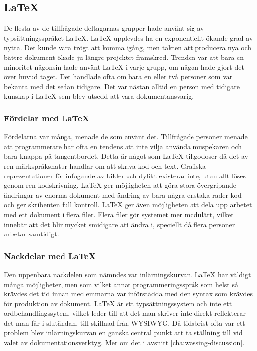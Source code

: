 \subsection{LaTeX}
\label{sec:wassing-latex}
De flesta av de tillfrågade deltagarnas grupper hade använt sig av typsättningsspråket LaTeX. LaTeX upplevdes ha en exponentiellt ökande grad av nytta. Det kunde vara trögt att komma igång, men takten att producera nya och bättre dokument ökade ju längre projektet framskred. Trenden var att bara en minoritet någonsin hade använt LaTeX i varje grupp, om någon hade gjort det över huvud taget. Det handlade ofta om bara en eller två personer som var bekanta med det sedan tidigare. Det var nästan alltid en person med tidigare kunskap i LaTeX som blev utsedd att vara dokumentansvarig.

\subsubsection{Fördelar med LaTeX}
Fördelarna var många, menade de som använt det. Tillfrågade personer menade att programmerare har ofta en tendens att inte vilja använda muspekaren och bara knappa på tangentbordet. Detta är något som LaTeX tillgodoser då det av ren märkspråksnatur handlar om att skriva kod och text. Grafiska representationer för infogande av bilder och dylikt existerar inte, utan allt löses genom ren kodskrivning. LaTeX ger möjligheten att göra stora övergripande ändringar av enorma dokument med ändring av bara några enstaka rader kod och ger skribenten full kontroll. LaTeX ger även möjligheten att dela upp arbetet med ett dokument i flera filer. Flera filer gör systemet mer modulärt, vilket innebär att det blir mycket smidigare att ändra i, speciellt då flera personer arbetar samtidigt.

\subsubsection{Nackdelar med LaTeX}
Den uppenbara nackdelen som nämndes var inlärningskurvan. LaTeX har väldigt många möjligheter, men som vilket annat programmeringsspråk som helst så krävdes det tid innan medlemmarna var införstådda med den syntax som krävdes för produktion av dokument. LaTeX är ett typsättningssystem och inte ett ordbehandlingssytem, vilket leder till att det man skriver inte direkt reflekterar det man får i slutändan, till skillnad från WYSIWYG. Då tidsbrist ofta var ett problem blev inlärningskurvan en ganska central punkt att ta ställning till vid valet av dokumentationsverktyg. Mer om det i avsnitt \ref{cha:wassing-discussion}. 

